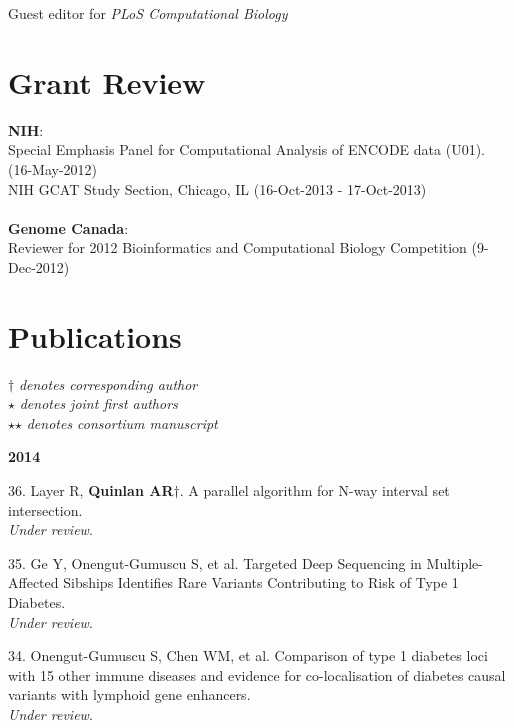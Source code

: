 \documentclass[margin,line]{cv}
\begin{document}
\begin{resume}
    Guest editor for \textit{PLoS Computational Biology}

    \section{\mysidestyle Grant Review} 
    \textbf{NIH}:
    \\
    Special Emphasis Panel for Computational Analysis of ENCODE data (U01). (16-May-2012)\\%
    NIH GCAT Study Section, Chicago, IL (16-Oct-2013 - 17-Oct-2013)%
    \\
    \\
    \textbf{Genome Canada}:
    \\
    Reviewer for 2012 Bioinformatics and Computational Biology Competition (9-Dec-2012)
    
    \section{\mysidestyle Publications}
    $\dagger$\textit{ denotes corresponding author}\\
    $\star$\textit{ denotes joint first authors}\\
    $\star$$\star$\textit{ denotes consortium manuscript}

    \textbf{2014} \\

    \begin{list}{*}{}


    \item[36.] Layer R, \textbf{Quinlan AR}$\dagger$.
    A parallel algorithm for N-way interval set intersection.\\
    \emph{Under review}.

    \item[35.] Ge Y, Onengut-Gumuscu S, et al.
    Targeted Deep Sequencing in Multiple-Affected Sibships Identifies Rare Variants Contributing to Risk of Type 1 Diabetes.\\
    \emph{Under review}.

    \item[34.] Onengut-Gumuscu S, Chen WM, et al.
    Comparison of type 1 diabetes loci with 15 other immune diseases and evidence for co-localisation of diabetes causal variants with lymphoid gene enhancers.\\
    \emph{Under review}.


\end{list}
\end{resume}
\end{document}
